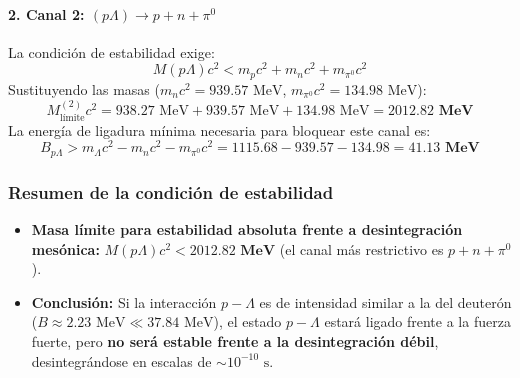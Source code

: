 \begin{problema}
\paragraph{2. Canal 2: $(p\Lambda) \longrightarrow p + n + \pi^0$}
La condición de estabilidad exige:
\begin{equation*}
M(p\Lambda)c^2 < m_p c^2 + m_n c^2 + m_{\pi^0} c^2
\end{equation*}
Sustituyendo las masas ($m_n c^2 = 939.57\text{ MeV}$, $m_{\pi^0} c^2 = 134.98\text{ MeV}$):
\begin{equation*}
M_{\text{límite}}^{(2)} c^2 = 938.27\text{ MeV} + 939.57\text{ MeV} + 134.98\text{ MeV} = \mathbf{2012.82\text{ MeV}}
\end{equation*}
La energía de ligadura mínima necesaria para bloquear este canal es:
\begin{equation*}
B_{p\Lambda} > m_\Lambda c^2 - m_n c^2 - m_{\pi^0} c^2 = 1115.68 - 939.57 - 134.98 = \mathbf{41.13\text{ MeV}}
\end{equation*}

\subsubsection*{Resumen de la condición de estabilidad}
\begin{itemize}
    \item \textbf{Masa límite para estabilidad absoluta frente a desintegración mesónica:} $M(p\Lambda)c^2 < \mathbf{2012.82\text{ MeV}}$ (el canal más restrictivo es $p+n+\pi^0$).
    \item \textbf{Conclusión:} Si la interacción $p-\Lambda$ es de intensidad similar a la del deuterón ($B \approx 2.23\text{ MeV} \ll 37.84\text{ MeV}$), el estado $p-\Lambda$ estará ligado frente a la fuerza fuerte, pero \textbf{no será estable frente a la desintegración débil}, desintegrándose en escalas de $\sim 10^{-10}\text{ s}$.
\end{itemize}
\end{problema}
\newpage

